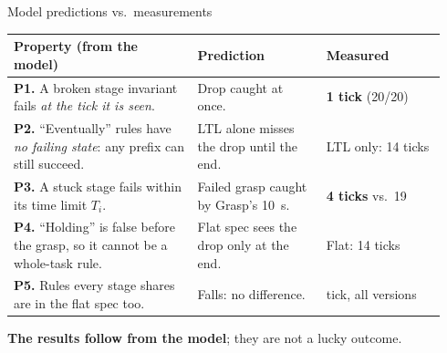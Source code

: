 \documentclass[14pt, aspectratio=169]{beamer}
\newcommand{\key}[1]{\textbf{\color{acc}#1}}
\begin{document}
\begin{frame}{Model predictions vs.\ measurements}
    \footnotesize
    \renewcommand{\arraystretch}{1.3}
    \begin{tabular}{@{}>{\raggedright\arraybackslash}p{0.40\linewidth} >{\raggedright\arraybackslash}p{0.28\linewidth} >{\raggedright\arraybackslash}p{0.26\linewidth}@{}}
        \textbf{\small Property (from the model)} & \textbf{\small Prediction} & \textbf{\small Measured} \\ \hline
        \textbf{P1.} A broken stage invariant fails \emph{at the tick it is seen}. & Drop caught at once. & \key{1 tick} (20/20) \\
        \textbf{P2.} ``Eventually'' rules have \emph{no failing state}: any prefix can still succeed. & LTL alone misses the drop until the end. & LTL only: 14 ticks \\
        \textbf{P3.} A stuck stage fails within its time limit $T_i$. & Failed grasp caught by Grasp's 10~s. & \key{4 ticks} vs.\ 19 \\
        \textbf{P4.} ``Holding'' is false before the grasp, so it cannot be a whole-task rule. & Flat spec sees the drop only at the end. & Flat: 14 ticks \\
        \textbf{P5.} Rules every stage shares are in the flat spec too. & Falls: no difference. & 1 tick, all versions \\ \hline
    \end{tabular}
    \vspace{0.15cm}

    \small \key{The results follow from the model}; they are not a lucky outcome.
\end{frame}
\end{document}
